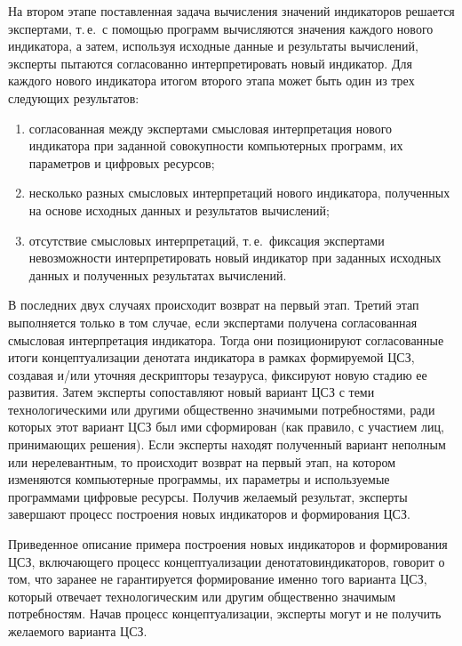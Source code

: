 \begin{multicols}{2}
   На втором этапе поставленная задача вычисления значений индикаторов решается 
экспертами, т.\,е.\ с помощью программ вычисляются значения каждого нового индикатора, 
а затем, используя исходные данные и результаты вычислений, эксперты пытаются 
согласованно интерпретировать новый индикатор. Для каждого нового индикатора итогом 
второго этапа может быть один из трех следующих результатов:
   \begin{enumerate}[(1)]
\item согласованная между экспертами смысловая интерпретация нового 
индикатора при заданной совокупности компьютерных программ, их параметров и 
цифровых ресурсов;
\item несколько разных смысловых интерпретаций нового индикатора, 
полученных на основе исходных данных и результатов вычислений;
\item отсутствие смысловых интерпретаций, т.\,е.\ фиксация экспертами 
невозможности интерпретировать новый индикатор при заданных исходных 
данных и полученных результатах вычислений.
   \end{enumerate}
   
   В последних двух случаях происходит возврат на первый этап. Третий этап выполняется 
только в том случае, если экспертами получена согласованная смысловая интерпретация 
индикатора. Тогда они позиционируют согласованные итоги концептуализации денотата 
индикатора в рамках формируемой ЦСЗ, создавая и/или уточняя дескрипторы тезауруса, 
фиксируют новую стадию ее развития. Затем эксперты сопоставляют новый вариант ЦСЗ с 
теми технологическими или другими общественно значимыми потребностями, ради которых 
этот вариант ЦСЗ был ими сформирован (как правило, с участием лиц, принимающих 
решения). Если эксперты находят полученный вариант неполным или нерелевантным, то 
происходит возврат на первый этап, на котором изменяются компьютерные программы, их 
параметры и используемые программами цифровые ресурсы. Получив желаемый результат, 
эксперты завершают процесс построения новых индикаторов и формирования ЦСЗ.
   
   Приведенное описание примера построения новых индикаторов и формирования ЦСЗ, 
вклю\-чающего процесс концептуализации денотатов\linebreak индикаторов, говорит о том, что заранее 
не гарантируется формирование именно того варианта ЦСЗ, который отвечает 
технологическим или другим общественно значимым потребностям. Начав процесс 
концептуализации, эксперты могут и не получить желаемого варианта ЦСЗ.
   

\end{multicols}
